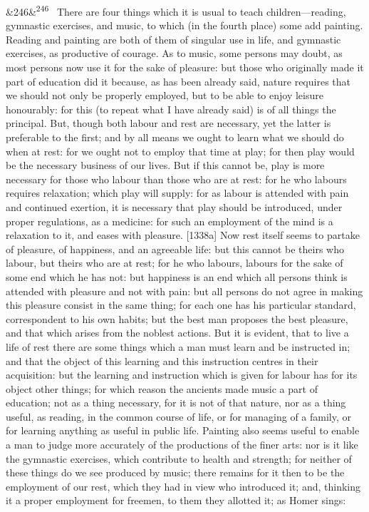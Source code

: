 \documentclass[12pt]{article}
\newcommand{\para}[1][]{\par\noindent\ifx&#1&\else\textsuperscript{\footnotesize #1}~\fi}
\begin{document}
\para[246] There are four things which it is usual to teach children---reading, gymnastic exercises, and music, to which (in the fourth place) some add painting. Reading and painting are both of them of singular use in life, and gymnastic exercises, as productive of courage. As to music, some persons may doubt, as most persons now use it for the sake of pleasure: but those who originally made it part of education did it because, as has been already said, nature requires that we should not only be properly employed, but to be able to enjoy leisure honourably: for this (to repeat what I have already said) is of all things the principal. But, though both labour and rest are necessary, yet the latter is preferable to the first; and by all means we ought to learn what we should do when at rest: for we ought not to employ that time at play; for then play would be the necessary business of our lives. But if this cannot be, play is more necessary for those who labour than those who are at rest: for he who labours requires relaxation; which play will supply: for as labour is attended with pain and continued exertion, it is necessary that play should be introduced, under proper regulations, as a medicine: for such an employment of the mind is a relaxation to it, and eases with pleasure. [1338a] Now rest itself seems to partake of pleasure, of happiness, and an agreeable life: but this cannot be theirs who labour, but theirs who are at rest; for he who labours, labours for the sake of some end which he has not: but happiness is an end which all persons think is attended with pleasure and not with pain: but all persons do not agree in making this pleasure consist in the same thing; for each one has his particular standard, correspondent to his own habits; but the best man proposes the best pleasure, and that which arises from the noblest actions. But it is evident, that to live a life of rest there are some things which a man must learn and be instructed in; and that the object of this learning and this instruction centres in their acquisition: but the learning and instruction which is given for labour has for its object other things; for which reason the ancients made music a part of education; not as a thing necessary, for it is not of that nature, nor as a thing useful, as reading, in the common course of life, or for managing of a family, or for learning anything as useful in public life. Painting also seems useful to enable a man to judge more accurately of the productions of the finer arts: nor is it like the gymnastic exercises, which contribute to health and strength; for neither of these things do we see produced by music; there remains for it then to be the employment of our rest, which they had in view who introduced it; and, thinking it a proper employment for freemen, to them they allotted it; as Homer sings:
\end{document}
